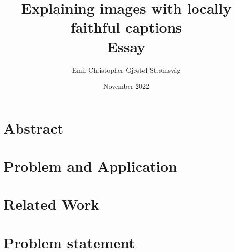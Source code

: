 \documentclass[UKenglish]{article}
\begin{document}
    \title{Explaining images with locally faithful captions \\ \large Essay}     
    \author{Emil Christopher Gjøstøl Strømsvåg}
    \date{November 2022}
    \maketitle

\newpage
\tableofcontents{}
\newpage


\section{Abstract}

\section{Problem and Application}


\section{Related Work} %


\section{Problem statement} %



\newpage
\printbibliography
\end{document}

